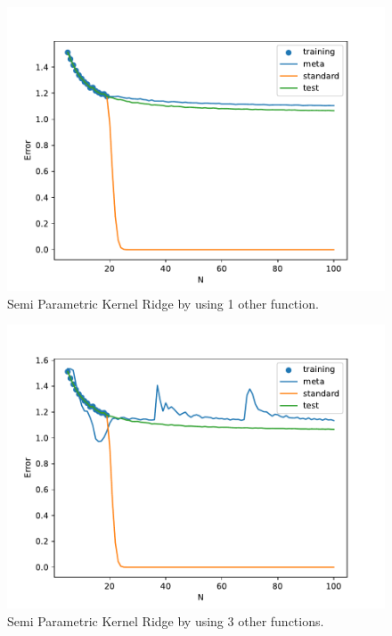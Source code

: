 \documentclass{tran-l}
\theoremstyle{definition}
\theoremstyle{remark}
\numberwithin{equation}{section}
\begin{document}
\begin{figure}[h!]
   \centering
   \includegraphics[width=\textwidth]{Figures/initial_study/lc_pred_funcs_1.pdf}
   \caption{Semi Parametric Kernel Ridge by using 1 other function. }
\end{figure}

\begin{figure}[h!]
   \centering
   \includegraphics[width=\textwidth]{Figures/initial_study/lc_funcs_3.pdf}
   \caption{Semi Parametric Kernel Ridge by using 3 other functions. }
\end{figure}
\end{document}
